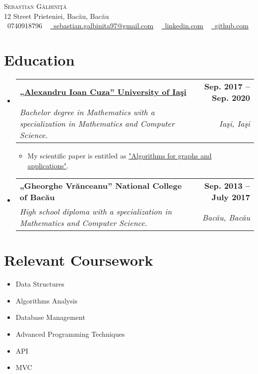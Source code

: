 \documentclass[letterpaper,11pt]{article}
\makeatletter
\newcommand{\resumeSubheading}[4]{
	\vspace{-2pt}\item
	\begin{tabular*}{1.0\textwidth}[t]{l@{\extracolsep{\fill}}r}
		\textbf{#1} & \textbf{\small #2} \\
		\textit{\small#3} & \textit{\small #4} \\
	\end{tabular*}\vspace{-7pt}
}
\newcommand{\resumeSubHeadingListStart}{\begin{itemize}[leftmargin=0.0in, label={}]}
\newcommand{\resumeSubHeadingListEnd}{\end{itemize}}
\makeatother
\begin{document}
	
	
	\begin{center}
		{\Huge \scshape Sebastian G\u albini\c t\u a } \\ \vspace{1pt}
		12 Street Prieteniei, Bac\u au, Bac\u au \\ \vspace{1pt}
		\small \raisebox{-0.1\height}\faPhone\ 0740918796 ~ \href{mailto:sebastian.galbinita97@gmail.com}{\raisebox{-0.2\height}\faEnvelope\  \underline{sebastian.galbinita97@gmail.com}} ~ 
		\href{https://linkedin.com/in/galbinita-sebastian}{\raisebox{-0.2\height}\faLinkedin\ \underline{linkedin.com}}  ~
		\href{https://github.com/GalbinitaSebastian97}{\raisebox{-0.2\height}\faGithub\ \underline{github.com}}
		\vspace{-8pt}
	\end{center}
	
	
	\section{Education}
	\resumeSubHeadingListStart
	\resumeSubheading
	{\href{https://github.com/GalbinitaSebastian97/CV-LaTeX-/tree/main/Acts/Faculty}{„Alexandru Ioan Cuza” University of Ia\c si}}{Sep. 2017 -- Sep. 2020}
	{Bachelor degree in Mathematics with a specialization in Mathematics and Computer Science.}{Ia\c si, Ia\c si}
	\begin{itemize}[itemsep=-5pt, parsep=6pt]
		\item\small My scientific paper is entitled as \href{https://github.com/GalbinitaSebastian97/Licenta-2017-2020/blob/master/Licenta/licentaa.pdf}{"Algorithms for graphs and applications"}. 	
	\end{itemize}
	\resumeSubheading
	{„Gheorghe Vr\u anceanu” National College of Bac\u au}{Sep. 2013 -- July 2017}
	{High school diploma with a specialization in Mathematics and Computer Science.}{Bac\u au, Bac\u au}
	\resumeSubHeadingListEnd
	
	\section{Relevant Coursework}
	\begin{multicols}{3}
		\begin{itemize}[itemsep=-5pt, parsep=6pt]
			\item\small Data Structures
			\item Algorithms Analysis
			\item Database Management
			\item Advanced Programming Techniques
			\item API
			\item MVC

		\end{itemize}
	\end{multicols}
	\vspace*{2.0\multicolsep}
	
\end{document}
